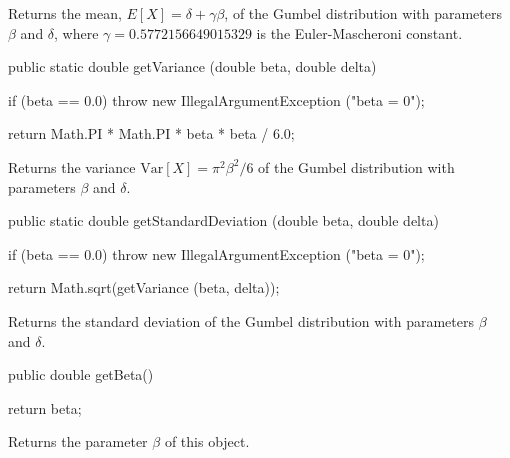 \begin{tabb}  Returns the mean,  $E[X] = \delta + \gamma\beta$,
   of the Gumbel distribution with parameters $\beta$ and $\delta$,
  where $\gamma = 0.5772156649015329$ is the Euler-Mascheroni constant.
\end{tabb}
\begin{htmlonly}
\end{htmlonly}
\begin{code}

   public static double getVariance (double beta, double delta)\begin{hide} {
     if (beta == 0.0)
         throw new IllegalArgumentException ("beta = 0");

      return Math.PI * Math.PI * beta * beta / 6.0;
   }\end{hide}
\end{code}
\begin{tabb}  Returns the variance $\mbox{Var}[X] =
  \pi^2 \beta^2\!/6$ of the Gumbel distribution with parameters  $\beta$ and $\delta$.
\end{tabb}
\begin{htmlonly}
\end{htmlonly}
\begin{code}

   public static double getStandardDeviation (double beta, double delta)\begin{hide} {
     if (beta == 0.0)
         throw new IllegalArgumentException ("beta = 0");

      return  Math.sqrt(getVariance (beta, delta));
   }\end{hide}
\end{code}
\begin{tabb}  Returns the standard deviation
   of the Gumbel distribution with parameters $\beta$ and $\delta$.
\end{tabb}
\begin{htmlonly}
\end{htmlonly}
\begin{code}

   public double getBeta()\begin{hide} {
      return beta;
   }\end{hide}
\end{code}
  \begin{tabb} Returns the parameter $\beta$  of this object.
  \end{tabb}
